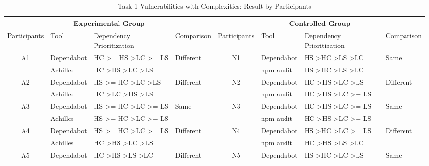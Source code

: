 \documentclass[conference]{IEEEtran}
\begin{document}
	\begin{table}
		\caption{Task 1 Vulnerabilities with Complexities: Result by Participants}
		\centering
		\begin{tabular}{clll|clll}
			\toprule
			\multicolumn{4}{c|}{Experimental Group} & \multicolumn{4}{c}{Controlled Group}  \\ 
			\midrule
			Participants         & Tool       & Dependency Prioritization & Comparison & Participants & Tool  & Dependency Prioritization & Comparison \\ 
			\midrule
			\multirow{2}{*}{A1}   & Dependabot    & HC \textgreater{}= HS \textgreater LC \textgreater{}= LS & \multirow{2}{*}{Different} & \multirow{2}{*}{N1} & Dependabot & HS \textgreater HC \textgreater LS \textgreater LC & \multirow{2}{*}{Same} \\ 
			& Achilles      & HC \textgreater HS \textgreater LC \textgreater LS       & & & npm audit & HS \textgreater HC \textgreater LS \textgreater LC & \\ \midrule
			\multirow{2}{*}{A2}   & Dependabot    & HS \textgreater{}= HC \textgreater LC \textgreater LS    & \multirow{2}{*}{Different} & \multirow{2}{*}{N2} & Dependabot & HC \textgreater HS \textgreater LC \textgreater LS & \multirow{2}{*}{Different} \\ 
			& Achilles      & HC \textgreater LC \textgreater HS \textgreater LS       & & & npm audit & HC \textgreater HS \textgreater LC \textgreater{}= LS & \\ \midrule
			\multirow{2}{*}{A3}   & Dependabot    & HS \textgreater{}= HC \textgreater LC \textgreater{}= LS & \multirow{2}{*}{Same} & \multirow{2}{*}{N3} & Dependabot & HC \textgreater HS \textgreater LC \textgreater{}= LS & \multirow{2}{*}{Same} \\ 
			& Achilles      & HS \textgreater{}= HC \textgreater LC \textgreater{}= LS & & & npm audit & HC \textgreater HS \textgreater LC \textgreater{}= LS & \\ \midrule
			\multirow{2}{*}{A4}   & Dependabot    & HS \textgreater{}= HC \textgreater LC \textgreater{}= LS & \multirow{2}{*}{Different} & \multirow{2}{*}{N4} & Dependabot & HS \textgreater HC \textgreater LC \textgreater{}= LS  & \multirow{2}{*}{Different} \\ 
			& Achilles      & HC \textgreater HS \textgreater LC \textgreater LS       & & & npm audit & HC \textgreater HS \textgreater LS \textgreater LC & \\ \midrule
			\multirow{2}{*}{A5}   & Dependabot    & HC \textgreater HS \textgreater LS \textgreater LC       & \multirow{2}{*}{Different} & \multirow{2}{*}{N5} & Dependabot & HS \textgreater HC \textgreater LC \textgreater LS & \multirow{2}{*}{Same} \\ 

\end{tabular}
\end{table}
\end{document}
